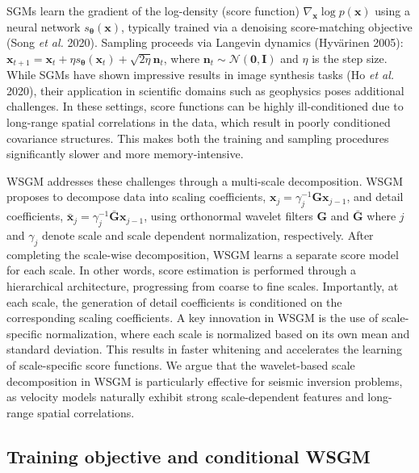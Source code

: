 \documentclass{IMAGE2025}
\begin{document}
SGMs learn the gradient of the log-density (score function)
\(\nabla_{\mathbf{x}} \log p(\mathbf{x})\) using a neural network
\(s_{\boldsymbol{\theta}}(\mathbf{x})\), typically trained via a
denoising score-matching objective (Song \emph{et al.} 2020). Sampling
proceeds via Langevin dynamics (Hyvärinen 2005):
\(\mathbf{x}_{t+1} = \mathbf{x}_t + \eta s_{\boldsymbol{\theta}}(\mathbf{x}_t) + \sqrt{2 \eta} \mathbf{n}_t\),
where \(\mathbf{n}_t \sim \mathcal{N}(\mathbf{0}, \mathbf{I})\) and
\(\eta\) is the step size. While SGMs have shown impressive results in
image synthesis tasks (Ho \emph{et al.} 2020), their application in
scientific domains such as geophysics poses additional challenges. In
these settings, score functions can be highly ill-conditioned due to
long-range spatial correlations in the data, which result in poorly
conditioned covariance structures. This makes both the training and
sampling procedures significantly slower and more memory-intensive.

WSGM addresses these challenges through a multi-scale decomposition.
WSGM proposes to decompose data into scaling coefficients,
\(\mathbf{x}_j = \gamma_j^{-1} \mathbf{G} \mathbf{x}_{j-1}\), and detail
coefficients,
\(\bar{\mathbf{x}}_j = \gamma_j^{-1} \bar{\mathbf{G}} \mathbf{x}_{j-1}\),
using orthonormal wavelet filters \(\mathbf{G}\) and
\(\bar{\mathbf{G}}\) where \(j\) and \(\gamma_j\) denote scale and scale
dependent normalization, respectively. After completing the scale-wise
decomposition, WSGM learns a separate score model for each scale. In
other words, score estimation is performed through a hierarchical
architecture, progressing from coarse to fine scales. Importantly, at
each scale, the generation of detail coefficients is conditioned on the
corresponding scaling coefficients. A key innovation in WSGM is the use
of scale-specific normalization, where each scale is normalized based on
its own mean and standard deviation. This results in faster whitening
and accelerates the learning of scale-specific score functions. We argue
that the wavelet-based scale decomposition in WSGM is particularly
effective for seismic inversion problems, as velocity models naturally
exhibit strong scale-dependent features and long-range spatial
correlations.

\subsection{Training objective and conditional
WSGM}\label{training-objective-and-conditional-wsgm}
\end{document}

